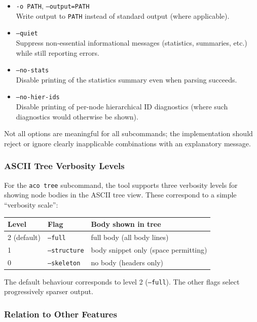 \documentclass[11pt]{article}
\begin{document}
\begin{itemize}[leftmargin=2em]
  \item \texttt{-o PATH}, \texttt{--output=PATH} \\
        Write output to \texttt{PATH} instead of standard output (where applicable).
  \item \texttt{--quiet} \\
        Suppress non-essential informational messages (statistics, summaries, etc.) while still reporting errors.
  \item \texttt{--no-stats} \\
        Disable printing of the statistics summary even when parsing succeeds.
  \item \texttt{--no-hier-ids} \\
        Disable printing of per-node hierarchical ID diagnostics (where such diagnostics would otherwise be shown).
\end{itemize}

Not all options are meaningful for all subcommands; the implementation should reject or ignore clearly inapplicable combinations with an explanatory message.

\subsubsection*{ASCII Tree Verbosity Levels}

For the \texttt{aco tree} subcommand, the tool supports three verbosity levels for showing node bodies in the ASCII tree view. These correspond to a simple ``verbosity scale'':

\begin{center}
\begin{tabular}{lll}
\hline
\textbf{Level} & \textbf{Flag}        & \textbf{Body shown in tree} \\
\hline
2 (default)    & \texttt{--full}      & full body (all body lines) \\
1              & \texttt{--structure} & body snippet only (space permitting) \\
0              & \texttt{--skeleton}  & no body (headers only) \\
\hline
\end{tabular}
\end{center}

The default behaviour corresponds to level 2 (\texttt{--full}). The other flags select progressively sparser output.

\subsubsection*{Relation to Other Features}
\end{document}
